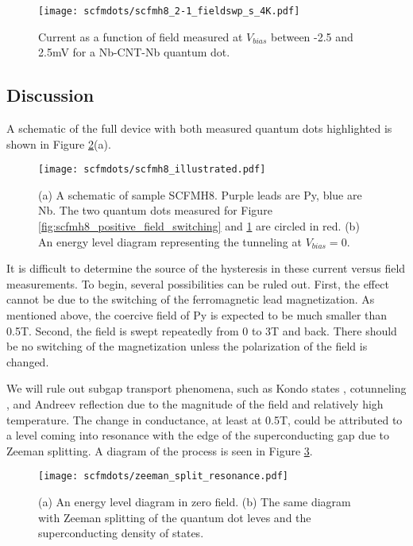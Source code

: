 \begin{figure}
    \centering
    \texttt{[image: scfmdots/scfmh8\_2-1\_fieldswp\_s\_4K.pdf]}
    \caption{Current as a function of field measured at $V_{bias}$ between -2.5 and 2.5mV for a Nb-CNT-Nb quantum dot. }
    \label{fig:scfmh8_all_superconducting}
\end{figure}

\subsection{Discussion}

A schematic of the full device with both measured quantum dots highlighted is shown in Figure \ref{fig:scfmh8_illustration}(a). 

\begin{figure}
    \centering
    \texttt{[image: scfmdots/scfmh8\_illustrated.pdf]}
    \caption{(a) A schematic of sample SCFMH8. Purple leads are Py, blue are Nb. The two quantum dots measured for Figure \ref{fig:scfmh8_positive_field_switching} and \ref{fig:scfmh8_all_superconducting} are circled in red. (b) An energy level diagram representing the tunneling at $V_{bias}=0$.}
    \label{fig:scfmh8_illustration}
\end{figure}

It is difficult to determine the source of the hysteresis in these current versus field measurements. To begin, several possibilities can be ruled out. First, the effect cannot be due to the switching of the ferromagnetic lead magnetization. As mentioned above, the coercive field of Py is expected to be much smaller than 0.5T. Second, the field is swept repeatedly from 0 to 3T and back. There should be no switching of the magnetization unless the polarization of the field is changed.

We will rule out subgap transport phenomena, such as Kondo states \cite{Nygard2000, Grove-Rasmussen2007, Jarillo-Herrero2005}, cotunneling \cite{Liang2002}, and Andreev reflection \cite{Pillet2010} due to the magnitude of the field and relatively high temperature. The change in conductance, at least at 0.5T, could be attributed to a level coming into resonance with the edge of the superconducting gap due to Zeeman splitting. A diagram of the process is seen in Figure \ref{fig:zeeman_split_resonance}.

\begin{figure}
    \centering
    \texttt{[image: scfmdots/zeeman\_split\_resonance.pdf]}
    \caption{(a) An energy level diagram in zero field. (b) The same diagram with Zeeman splitting of the quantum dot leves and the superconducting density of states.}
    \label{fig:zeeman_split_resonance}
\end{figure}


